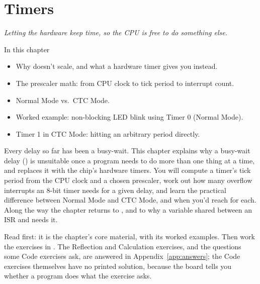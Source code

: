 
\chapter{Timers}
\label{c5:ch}

{\large\itshape Letting the hardware keep time, so the CPU is free to do something else.\par}

\begin{chapterbox}{In this chapter}
\begin{itemize}
  \item Why  doesn't scale, and what a hardware timer gives you instead.
  \item The prescaler math: from CPU clock to tick period to interrupt count.
  \item Normal Mode vs.\ CTC Mode.
  \item Worked example: non-blocking LED blink using Timer 0 (Normal Mode).
  \item Timer 1 in CTC Mode: hitting an arbitrary period directly.
\end{itemize}
\end{chapterbox}

Every delay so far has been a busy-wait. This chapter explains why a busy-wait delay
() is unsuitable once a program needs to do more than one thing at a time, and
replaces it with the chip's hardware timers. You will compute a timer's tick period from the CPU
clock and a chosen prescaler, work out how many overflow interrupts an 8-bit timer needs for a
given delay, and learn the practical difference between Normal Mode and CTC Mode, and when you'd
reach for each. Along the way the chapter returns to , and to why a variable shared
between an ISR and  needs it.

Read  first: it is the chapter's core material, with its worked examples.
Then work the exercises in . The Reflection and Calculation exercises,
and the questions some Code exercises ask, are answered in Appendix~\ref{app:answers}; the Code
exercises themselves have no printed solution, because the board tells you whether a program does
what the exercise asks.




